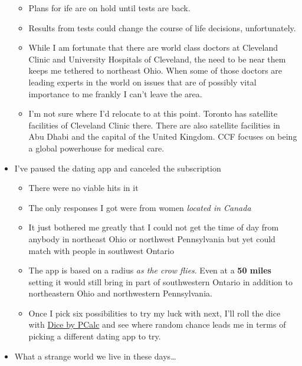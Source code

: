 \begin{itemize}
  \begin{itemize}
  \tightlist
  \item
    Plans for ife are on hold until tests are back.
  \item
    Results from tests could change the course of life decisions,
    unfortunately.
  \item
    While I am fortunate that there are world class doctors at Cleveland
    Clinic and University Hospitals of Cleveland, the need to be near
    them keeps me tethered to northeast Ohio. When some of those doctors
    are leading experts in the world on issues that are of possibly
    vital importance to me frankly I can't leave the area.
  \item
    I'm not sure where I'd relocate to at this point. Toronto has
    satellite facilities of Cleveland Clinic there. There are also
    satellite facilities in Abu Dhabi and the capital of the United
    Kingdom. CCF focuses on being a global powerhouse for medical care.
  \end{itemize}
\item
  I've paused the dating app and canceled the subscription

  \begin{itemize}
  \tightlist
  \item
    There were no viable hits in it
  \item
    The only responses I got were from women \emph{located in Canada}
  \item
    It just bothered me greatly that I could not get the time of day
    from anybody in northeast Ohio or northwest Pennsylvania but yet
    could match with people in southwest Ontario
  \item
    The app is based on a radius \emph{as the crow flies}. Even at a
    \textbf{50 miles} setting it would still bring in part of
    southwestern Ontario in addition to northeastern Ohio and
    northwestern Pennsylvania.
  \item
    Once I pick six possibilities to try my luck with next, I'll roll
    the dice with \href{https://www.pcalc.com/dice/}{Dice by PCalc} and
    see where random chance leads me in terms of picking a different
    dating app to try.
  \end{itemize}
\item
  What a strange world we live in these days\ldots{}
\end{itemize}
